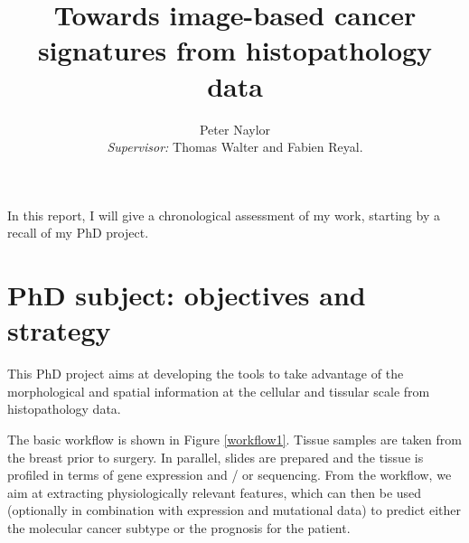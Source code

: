 \documentclass[a4paper,10pt]{article}
\begin{document}
\title{Towards image-based cancer signatures from histopathology data}


\author{Peter Naylor \\ {\small \textit{Supervisor:} Thomas Walter and Fabien Reyal.}}


\maketitle



In this report, I will give a chronological assessment of my work, starting by a recall of my PhD project.

\section{PhD subject: objectives and strategy}

This  PhD  project aims at developing the tools to take advantage of
the morphological and spatial information at the cellular and tissular
scale from histopathology data. 


The basic workflow is shown in Figure \ref{workflow1}. Tissue samples
are taken from the breast prior to surgery. In parallel, slides are
prepared and the tissue is profiled in terms of gene expression and /
or sequencing. From the workflow, we aim at extracting physiologically
relevant features, which can then be used (optionally in combination with
expression and mutational data) to predict either the molecular
cancer subtype or the prognosis for the patient. 
\end{document}
